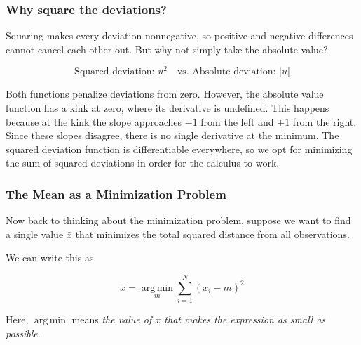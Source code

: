 \documentclass[12pt]{article}
\begin{document}
\subsubsection{Why square the deviations?}

Squaring makes every deviation nonnegative,
so positive and negative differences
cannot cancel each other out. But why not simply take the absolute value?

\[
\text{Squared deviation: }u^2 \quad \text{vs. }
\text{Absolute deviation: }|u|
\]

\begin{center}
\end{center}

Both functions penalize deviations from zero. However, the absolute value function has a kink at zero, where its derivative is undefined. This happens because at the kink the slope approaches $-1$ from the left and $+1$ from the right. Since these slopes disagree, there is no single
derivative at the minimum. The squared deviation function is differentiable everywhere, so we opt for minimizing the sum of squared deviations in order for the calculus to work.


\subsubsection{The Mean as a Minimization Problem}

Now back to thinking about the minimization problem, suppose we want to find a single value $\bar{x}$ that minimizes the total squared distance from all observations.

We can write this as

\[
\bar{x}
=
\operatorname*{arg\,min}_{m}
\sum_{i=1}^{N}(x_i-m)^2
\]

Here, $\operatorname{arg\,min}$ means
\textit{the value of $\bar{x}$ that makes
the expression as small as possible}.
\end{document}
